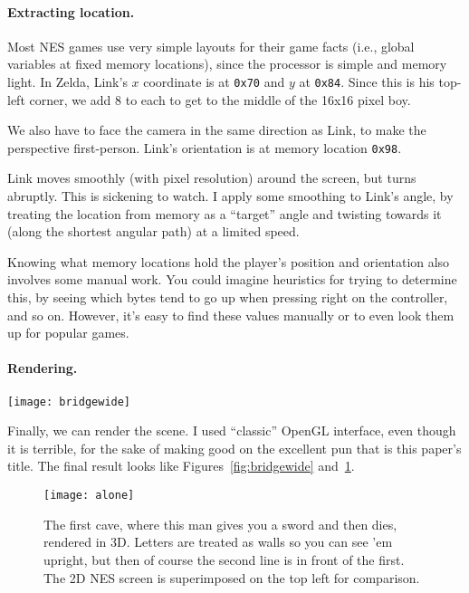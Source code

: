 \documentclass[twocolumn]{article}
\begin{document}
\paragraph{Extracting location.}

Most NES games use very simple layouts for their game facts (i.e.,
global variables at fixed memory locations), since the processor is
simple and memory light.\cite{murphy2013first} In Zelda, Link's
$x$ coordinate is at \verb+0x70+ and $y$ at \verb+0x84+. Since this
is his top-left corner, we add 8 to each to get to the middle of the
16x16 pixel boy.

We also have to face the camera in the same direction as Link, to
make the perspective first-person. Link's orientation is at memory
location \verb+0x98+.

Link moves smoothly (with pixel resolution) around the screen, but
turns abruptly. This is sickening to watch. I apply some smoothing to
Link's angle, by treating the location from memory as a ``target''
angle and twisting towards it (along the shortest angular path) at a
limited speed.

Knowing what memory locations hold the player's position and
orientation also involves some manual work. You could imagine
heuristics for trying to determine this, by seeing which bytes tend to
go up when pressing right on the controller, and so on. However, it's
easy to find these values manually or to even look them up for popular
games.

\paragraph{Rendering.}

\begin{figure*}[t]
\begin{center}
\texttt{[image: bridgewide]}
\end{center}\vspace{-0.1in}
\caption{A representative view of the Legend of Zelda in glorious
  3D.} \label{fig:bridgewide}
\end{figure*}


Finally, we can render the scene. I used ``classic'' OpenGL interface,
even though it is terrible, for the sake of making good on the
excellent pun that is this paper's title. The final result looks like
Figures~\ref{fig:bridgewide} and~\ref{fig:alone}.

\begin{figure}[ht]
\begin{center}
\texttt{[image: alone]}
\end{center}\vspace{-0.1in}
\caption{The first cave, where this man gives you a sword and then dies,
rendered in 3D. Letters are treated as walls so you can see 'em upright,
but then of course the second line is in front of the first. The 2D NES
screen is superimposed on the top left for comparison.
} \label{fig:alone}
\end{figure}
\end{document}
